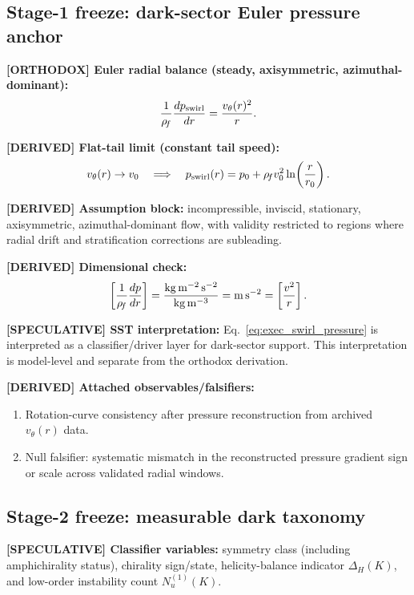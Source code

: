 \subsection{Stage-1 freeze: dark-sector Euler pressure anchor}
\textbf{[ORTHODOX] Euler radial balance (steady, axisymmetric, azimuthal-dominant):}
\begin{align}
    \frac{1}{\rho_{\!f}}\frac{dp_{\mathrm{swirl}}}{dr}
    =
    \frac{v_\theta(r)^2}{r}.
    \label{eq:exec_swirl_pressure}
\end{align}

\textbf{[DERIVED] Flat-tail limit (constant tail speed):}
\begin{align}
    v_\theta(r)\to v_0
    \quad\Longrightarrow\quad
    p_{\mathrm{swirl}}(r)
    =
    p_0 + \rho_{\!f} v_0^2\ln\!\left(\frac{r}{r_0}\right).
\end{align}

\textbf{[DERIVED] Assumption block:}
incompressible, inviscid, stationary, axisymmetric, azimuthal-dominant flow, with validity restricted to regions where radial drift and stratification corrections are subleading.

\textbf{[DERIVED] Dimensional check:}
\[
\left[\frac{1}{\rho_{\!f}}\frac{dp}{dr}\right]
=
\frac{\mathrm{kg\,m^{-2}\,s^{-2}}}{\mathrm{kg\,m^{-3}}}
=
\mathrm{m\,s^{-2}}
=
\left[\frac{v^2}{r}\right].
\]

\textbf{[SPECULATIVE] SST interpretation:}
Eq.~\eqref{eq:exec_swirl_pressure} is interpreted as a classifier/driver layer for dark-sector support. This interpretation is model-level and separate from the orthodox derivation.

\textbf{[DERIVED] Attached observables/falsifiers:}
\begin{enumerate}
    \item Rotation-curve consistency after pressure reconstruction from archived $v_\theta(r)$ data.
    \item Null falsifier: systematic mismatch in the reconstructed pressure gradient sign or scale across validated radial windows.
\end{enumerate}

\subsection{Stage-2 freeze: measurable dark taxonomy}
\textbf{[SPECULATIVE] Classifier variables:}
symmetry class (including amphichirality status), chirality sign/state, helicity-balance indicator $\Delta_H(K)$, and low-order instability count $N_u^{(1)}(K)$.

